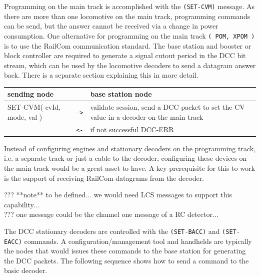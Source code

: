 Programming on the main track is accomplished with the \texttt{(SET-CVM)} message. As there are more than one locomotive on the main track, programming commands can be send, but the answer cannot be received via a change in power consumption. One alternative for programming on the main track \texttt{( POM, XPOM )} is to use the RailCom communication standard. The base station and booster or block controller are required to generate a signal cutout period in the DCC bit stream, which can be used by the locomotive decoders to send a datagram answer back. There is a separate section explaining this in more detail.

\begin{table}[ht!]
    \begin{center}
        \begin{tabular}{|p{}| c |p{}|}
            \toprule
            \textbf{sending node} & & \textbf{ base station node} \\
            \midrule
            SET-CVM( cvId, mode, val ) & \texttt{->} & validate session, send a DCC packet to set the CV value in a decoder on the main track \\
            & \texttt{<-} & if not successful DCC-ERR \\
            \bottomrule
        \end{tabular}
    \end{center}
\end{table}


Instead of configuring engines and stationary decoders on the programming track, i.e. a separate track or just a cable to the decoder, configuring  these devices on the main track would be a great asset to have. A key prerequisite for this to work is the support of receiving RailCom datagrams from the decoder.

??? **note** to be defined... we would need LCS messages to support this capability... \\
??? one message could be the channel one message of a RC detector...


The DCC stationary decoders are controlled with the \texttt{(SET-BACC)} and \texttt{(SET-EACC)} commands. A configuration/management tool and handhelds are typically the nodes that would issues these commands to the base station for generating the DCC packets. The following sequence shows how to send a command to the basic decoder.

